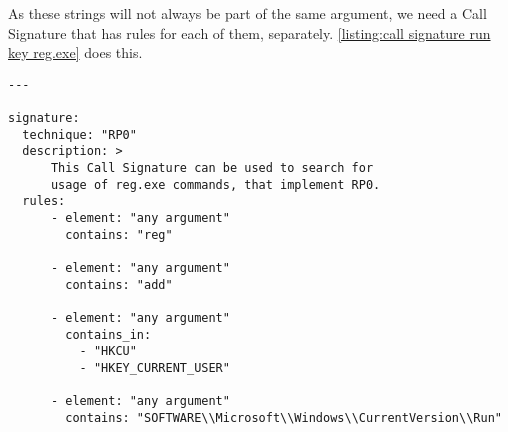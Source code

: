 As these strings will not always be part of the same argument, we need a Call Signature that has rules for each of them, separately. \autoref{listing:call signature run key reg.exe} does this.

\begin{lstlisting}[label={listing:call signature run key reg.exe}, caption={A Call Signature for \autoref{RP0}.}, captionpos=b]
---

signature:
  technique: "RP0"
  description: >
      This Call Signature can be used to search for
      usage of reg.exe commands, that implement RP0.
  rules:
      - element: "any argument"
        contains: "reg"

      - element: "any argument"
        contains: "add"

      - element: "any argument"
        contains_in:
          - "HKCU"
          - "HKEY_CURRENT_USER"

      - element: "any argument"
        contains: "SOFTWARE\\Microsoft\\Windows\\CurrentVersion\\Run"
\end{lstlisting}
